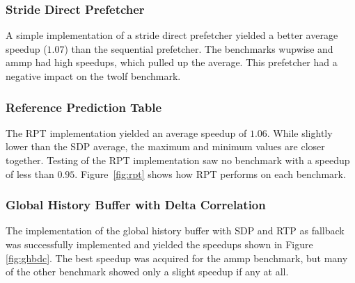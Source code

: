 \subsubsection{Stride Direct Prefetcher}
A simple implementation of a stride direct prefetcher yielded a better average speedup ($1.07$) than the sequential prefetcher.
The benchmarks wupwise and ammp had high speedups, which pulled up the average.
This prefetcher had a negative impact on the twolf benchmark.


\subsubsection{Reference Prediction Table}
The RPT implementation yielded an average speedup of $1.06$.
While slightly lower than the SDP average, the maximum and minimum values are closer together.
Testing of the RPT implementation saw no benchmark with a speedup of less than $0.95$.
Figure~\ref{fig:rpt} shows how RPT performs on each benchmark.

\begin{figure*}
  
  \caption{Performance of RPT prefetcher across benchmarks.}
  \label{fig:rpt}
\end{figure*}

\subsubsection{Global History Buffer with Delta Correlation}
The implementation of the global history buffer with SDP and RTP as fallback was successfully implemented and yielded the speedups shown in Figure \ref{fig:ghbdc}.
The best speedup was acquired for the ammp benchmark, but many of the other benchmark showed only a slight speedup if any at all.


\begin{figure*}
  
  \caption{Speedup of each benchmark as a function of degree for the global history buffer with delta correlation and fall back to SDP and RTP.}
  \label{fig:ghbdc}
\end{figure*}

\begin{figure*}
  
  \caption{Average speedup as a function of prefetching degree for our final prefetcher implementation.}
  \label{fig:ghbdcavg}
\end{figure*}
